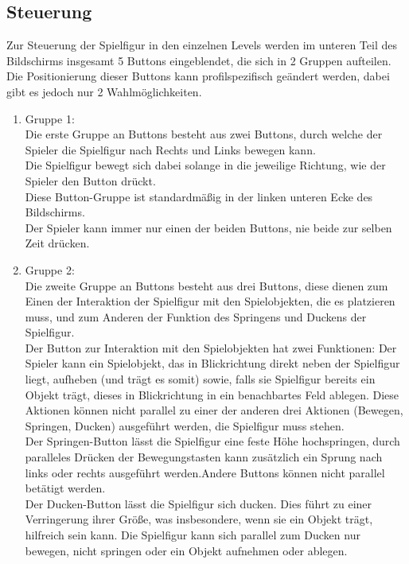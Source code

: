 \documentclass{scrartcl}
\begin{document}
\subsection{Steuerung}  \label{subsection:Steuerung}

Zur Steuerung der Spielfigur in den einzelnen Levels werden im unteren Teil des Bildschirms insgesamt 5 Buttons eingeblendet, die sich in 2 Gruppen aufteilen.\\
Die Positionierung dieser Buttons kann profilspezifisch geändert werden, dabei gibt es jedoch nur 2 Wahlmöglichkeiten.\\

\begin{enumerate}
	\item Gruppe 1:\\
	Die erste Gruppe an Buttons besteht aus zwei Buttons, durch welche der Spieler die Spielfigur nach Rechts und Links bewegen kann.\\
	Die Spielfigur bewegt sich dabei solange in die jeweilige Richtung, wie der Spieler den Button drückt.\\
	Diese Button-Gruppe ist standardmäßig in der linken unteren Ecke des Bildschirms.\\
	Der Spieler kann immer nur einen der beiden Buttons, nie beide zur selben Zeit drücken.\\
	
	\item Gruppe 2:\\
	Die zweite Gruppe an Buttons besteht aus drei Buttons, diese dienen zum Einen der Interaktion der Spielfigur mit den Spielobjekten, die es platzieren muss, und zum Anderen der Funktion des Springens und Duckens der Spielfigur.\\
	Der Button zur Interaktion mit den Spielobjekten hat zwei Funktionen: Der Spieler kann ein Spielobjekt, das in Blickrichtung direkt neben der Spielfigur liegt, aufheben (und trägt es somit) sowie, falls sie Spielfigur bereits ein Objekt trägt, dieses in Blickrichtung in ein benachbartes Feld ablegen. Diese Aktionen können nicht parallel zu einer der anderen drei Aktionen (Bewegen, Springen, Ducken) ausgeführt werden, die Spielfigur muss stehen.\\
	Der Springen-Button lässt die Spielfigur eine feste Höhe hochspringen, durch paralleles Drücken der Bewegungstasten kann zusätzlich ein Sprung nach links oder rechts ausgeführt werden.Andere Buttons können nicht parallel betätigt werden.\\
	Der Ducken-Button lässt die Spielfigur sich ducken. Dies führt zu einer Verringerung ihrer Größe, was insbesondere, wenn sie ein Objekt trägt, hilfreich sein kann. Die Spielfigur kann sich parallel zum Ducken nur bewegen, nicht springen oder ein Objekt aufnehmen oder ablegen.\\
	

\end{enumerate}
\end{document}
